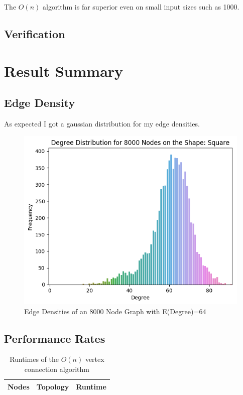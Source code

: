 \documentclass{article}
\begin{document}
	  The $O(n)$ algorithm is far superior even on small input sizes such as 1000.

	\subsection{Verification}

\section{Result Summary}
  \subsection{Edge Density}
  As expected I got a gaussian distribution for my edge densities.
  \begin{figure}[H]
  \centering
  \includegraphics[width=1 \textwidth]{square/edge_density/8000_64.png}
  \caption{Edge Densities of an 8000 Node Graph with E(Degree)=64}
  \end{figure}

  \subsection{Performance Rates}
  \begin{center}
	  \begin{table}[H]
		  \begin{tabular}{ |c|c|c| }
			\hline
			Nodes & Topology & Runtime \\
			\hline
		  \end{tabular}
		  \caption{Runtimes of the $O(n)$ vertex connection algorithm}
	  \end{table}
  \end{center}

\printbibliography
\end{document}
